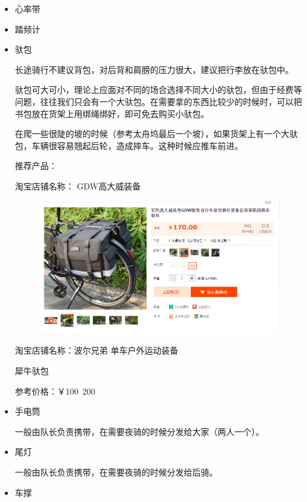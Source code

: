 \documentclass{ctexbook}
\begin{document}
\begin{itemize}
        \item 心率带
        
        \item 踏频计
        
        \item 驮包 

        长途骑行不建议背包，对后背和肩膀的压力很大，建议把行李放在驮包中。
    
        驮包可大可小，理论上应面对不同的场合选择不同大小的驮包，但由于经费等问题，往往我们只会有一个大驮包。在需要拿的东西比较少的时候时，可以把书包放在货架上用绑绳绑好，即可免去购买小驮包。
    
        在爬一些很陡的坡的时候（参考太舟坞最后一个坡），如果货架上有一个大驮包，车辆很容易翘起后轮，造成摔车。这种时候应推车前进。
    
        推荐产品：
    
        淘宝店铺名称： GDW高大威装备
        \begin{figure}[H]
            \begin{center}
            \includegraphics[scale=0.3]{fig/高大威_驮包.png}
            \end{center}
        \end{figure}
        淘宝店铺名称：波尔兄弟 单车户外运动装备
        
        犀牛驮包

        参考价格：￥100~200
        \item 手电筒 
    
        一般由队长负责携带，在需要夜骑的时候分发给大家（两人一个）。

        \item 尾灯
    
        一般由队长负责携带，在需要夜骑的时候分发给后骑。

        \item 车撑
        

\end{itemize}
\end{document}
